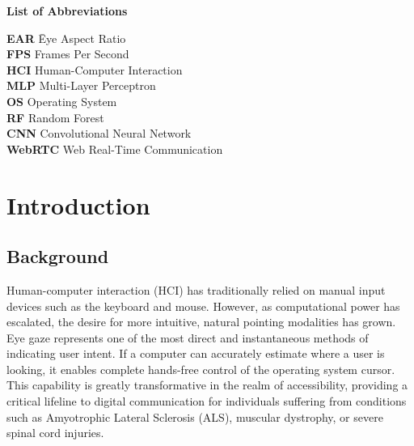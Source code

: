 \documentclass[12pt,a4paper]{report}
\begin{document}
\newpage
{}
\begin{center}
    \textbf{\large List of Abbreviations}
\end{center}
\vspace{0.5cm}
\begin{tabbing}
    \textbf{EAR} \hspace{1.5cm} \= Eye Aspect Ratio \\
    \textbf{FPS} \> Frames Per Second \\
    \textbf{HCI} \> Human-Computer Interaction \\
    \textbf{MLP} \> Multi-Layer Perceptron \\
    \textbf{OS} \> Operating System \\
    \textbf{RF} \> Random Forest \\
    \textbf{CNN} \> Convolutional Neural Network \\
    \textbf{WebRTC} \> Web Real-Time Communication
\end{tabbing}

\newpage
{}
\listoffigures

\newpage
{}
\listoftables

\newpage
{}
\chapter{Introduction}
\section{Background}
Human-computer interaction (HCI) has traditionally relied on manual input devices such as the keyboard and mouse. However, as computational power has escalated, the desire for more intuitive, natural pointing modalities has grown. Eye gaze represents one of the most direct and instantaneous methods of indicating user intent. If a computer can accurately estimate where a user is looking, it enables complete hands-free control of the operating system cursor. This capability is greatly transformative in the realm of accessibility, providing a critical lifeline to digital communication for individuals suffering from conditions such as Amyotrophic Lateral Sclerosis (ALS), muscular dystrophy, or severe spinal cord injuries. 
\end{document}
